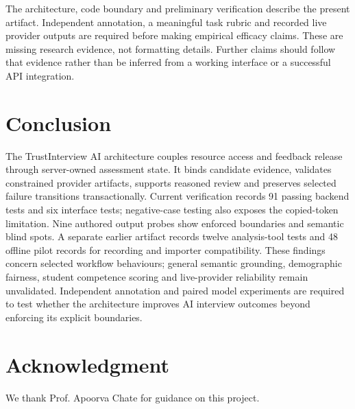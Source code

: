 \documentclass[conference]{IEEEtran}
\begin{document}
The architecture, code boundary and preliminary verification describe the present artifact. Independent annotation, a meaningful task rubric and recorded live provider outputs are required before making empirical efficacy claims. These are missing research evidence, not formatting details. Further claims should follow that evidence rather than be inferred from a working interface or a successful API integration.

\section{Conclusion}
The TrustInterview AI architecture couples resource access and feedback release through server-owned assessment state. It binds candidate evidence, validates constrained provider artifacts, supports reasoned review and preserves selected failure transitions transactionally. Current verification records 91 passing backend tests and six interface tests; negative-case testing also exposes the copied-token limitation. Nine authored output probes show enforced boundaries and semantic blind spots. A separate earlier artifact records twelve analysis-tool tests and 48 offline pilot records for recording and importer compatibility. These findings concern selected workflow behaviours; general semantic grounding, demographic fairness, student competence scoring and live-provider reliability remain unvalidated. Independent annotation and paired model experiments are required to test whether the architecture improves AI interview outcomes beyond enforcing its explicit boundaries.

\section*{Acknowledgment}
We thank Prof. Apoorva Chate for guidance on this project.

\end{document}
